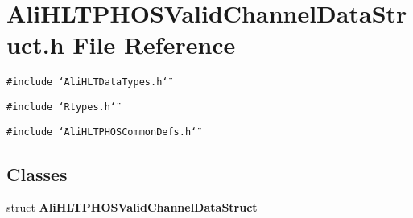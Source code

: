 \section{Ali\-HLTPHOSValid\-Channel\-Data\-Struct.h File Reference}
\label{AliHLTPHOSValidChannelDataStruct_8h}


{\tt \#include \char`\"{}Ali\-HLTData\-Types.h\char`\"{}}\par
{\tt \#include \char`\"{}Rtypes.h\char`\"{}}\par
{\tt \#include \char`\"{}Ali\-HLTPHOSCommon\-Defs.h\char`\"{}}\par
\subsection*{Classes}
\begin{CompactItemize}
\item 
struct {\bf Ali\-HLTPHOSValid\-Channel\-Data\-Struct}
\end{CompactItemize}
